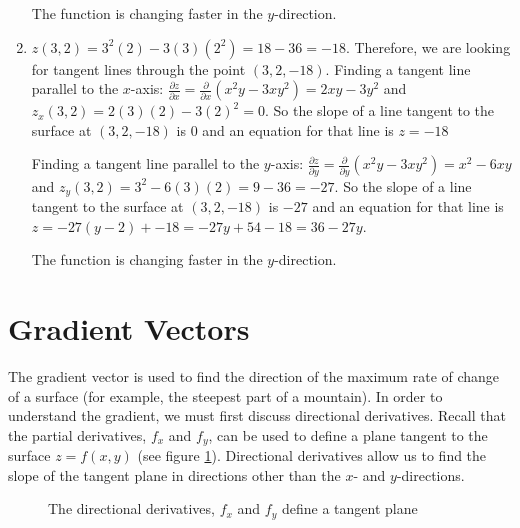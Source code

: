 \begin{Answer}[ref = tangent]
\begin{enumerate}
    The function is changing faster in the $y$-direction.

    \item $z(3, 2) = 3^2(2) - 3(3)(2^2) = 18 - 36 = -18$. Therefore, we are 
    looking for tangent lines through the point $(3, 2, -18)$. Finding a 
    tangent line parallel to the $x$-axis: $\frac{\partial z}{\partial x} = 
    \frac{\partial}{\partial x} \left( x^2y - 3xy^2 \right) = 2xy - 3y^2$ and 
    $z_x(3, 2) = 2(3)(2) - 3(2)^2 = 0$. So the slope of a line tangent to the 
    surface at $(3, 2, -18)$ is $0$ and an equation for that line is $z = -18$

    Finding a tangent line parallel to the $y$-axis: $\frac{\partial z}{
    \partial y} = \frac{\partial}{\partial y} \left( x^2y - 3xy^2 \right) = 
    x^2 - 6xy$ and $z_y(3, 2) = 3^2 - 6(3)(2) = 9 - 36 = -27$. So the slope of 
    a line tangent to the surface at $(3, 2, -18)$ is $-27$ and an equation for
    that line is $z = -27(y - 2) + -18 = -27y + 54 - 18 = 36 - 27y$.

    The function is changing faster in the $y$-direction. 
\end{enumerate}
\end{Answer}

\section{Gradient Vectors}
The gradient vector is used to find the direction of the maximum rate of change 
of a surface (for example, the steepest part of a mountain). In order to 
understand the gradient, we must first discuss directional derivatives. Recall 
that the partial derivatives, $f_x$ and $f_y$, can be used to define a plane 
tangent to the surface $z = f(x,y)$ (see figure \ref{fig:plane}). Directional 
derivatives allow us to find the slope of the tangent plane in directions 
other than the $x$- and $y$-directions. 

\begin{figure}[htbp]
    \centering
    \caption{The directional derivatives, $f_x$ and $f_y$ define a tangent 
    plane}
    \label{fig:plane}
\end{figure}

